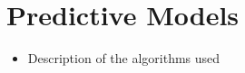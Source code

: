 \section{Predictive Models}
\label{predict}
\begin{itemize}
	\item Description of the algorithms used
\end{itemize}


